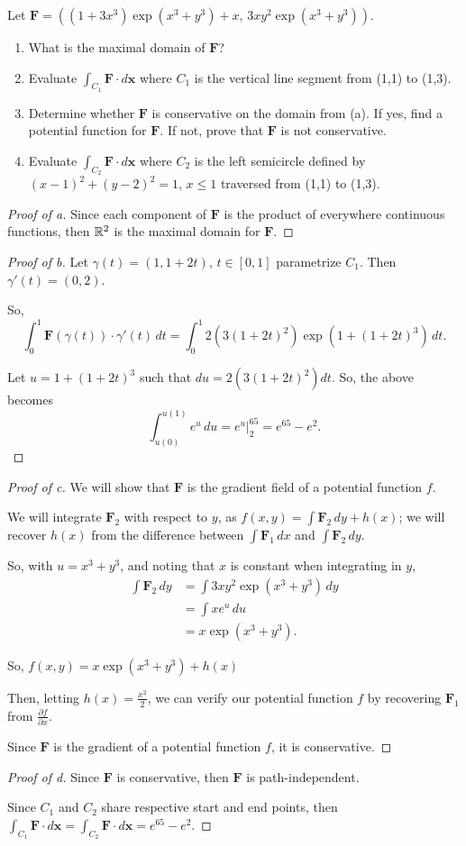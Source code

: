 \documentclass[../hw9]{subfiles}
\begin{document}
\begin{problem}[5]
Let $\textbf{F} = ((1+3x^3)\exp(x^3 + y^3) + x,\,  3xy^2\exp(x^3 + y^3))$.
\begin{enumerate}[label=(\alph*)]
	\item What is the maximal domain of $\textbf{F}$?
	\item Evaluate $\int_{C_1} \textbf{F} \cdot d \textbf{x}$ where $C_1$ is the vertical line segment from (1,1) to (1,3).
	\item Determine whether $\textbf{F}$ is conservative on the domain from (a).
	      If yes, find a potential function for  $\textbf{F}$.
	      If not, prove that $\textbf{F}$ is not conservative.
	\item Evaluate $\int_{C_2} \textbf{F}\cdot d \textbf{x}$ where $C_2$ is the left semicircle defined by  ${(x-1)}^2 + {(y-2)}^2 = 1,\, x\le 1$ traversed from (1,1) to (1,3).
\end{enumerate}
\end{problem}
\begin{proof}[Proof of a]
	Since each component of $\textbf{F}$ is the product of everywhere continuous functions, then  $\mathbb{R}^2$ is the maximal domain for $\textbf{F}$.
\end{proof}
\begin{proof}[Proof of b]
	Let $\gamma(t)=(1,1 + 2t),\, t\in [0,1]$ parametrize $C_1$.
	Then $\gamma'(t)=(0,2)$.

	So, \[
		\int_{0}^{1} \textbf{F}(\gamma(t))\cdot \gamma'(t) \,dt
		= \int_{0}^{1} 2(3{(1+2t)}^2)\exp(1+{(1+2t)}^3) \,dt
		.\]

	Let $u = 1 + {(1+2t)}^3$ such that $du=2(3{(1+2t)}^2)dt$.
	So, the above becomes \[
		\int^{u(1)}_{u(0)} e^u \,du = {e^u}\big\vert_2^{65}=e^{65}-e^2
		.\]
\end{proof}
\begin{proof}[Proof of c]
	We will show that $\textbf{F}$ is the gradient field of a potential function $f$.

	We will integrate $\textbf{F}_2$ with respect to $y$, as  $f(x,y)=\int \textbf{F}_2\,dy + h(x)$;
	we will recover $h(x)$ from the difference between  $\int \textbf{F}_1\,dx$ and $\int \textbf{F}_2\,dy$.

	So, with $u=x^3 + y^3$, and noting that $x$ is constant when integrating in  $y$,
	\begin{align*}
		\int \textbf{F}_2\,dy & = \int 3xy^2\exp(x^3+y^3)\,dy \\
		                      & = \int xe^u\,du               \\
		                      & = x\exp(x^3+y^3)
		.\end{align*}

	So, $f(x,y) = x\exp(x^3 + y^3) + h(x)$

	Then, letting $h(x)=\frac{x^2}{2}$, we can verify our potential function $f$ by recovering  $\textbf{F}_1$ from  $\frac{\partial f}{\partial x}$.

	Since $\textbf{F}$ is the gradient of a potential function  $f$, it is conservative.
\end{proof}
\begin{proof}[Proof of d]
	Since $\textbf{F}$ is conservative, then  $\textbf{F}$ is path-independent.

	Since $C_1$ and  $C_2$ share respective start and end points, then
	$\int_{C_1}\textbf{F}\cdot d \textbf{x}
		= \int_{C_2}\textbf{F}\cdot d \textbf{x}
		= e^{65}-e^2$.
\end{proof}
\end{document}
